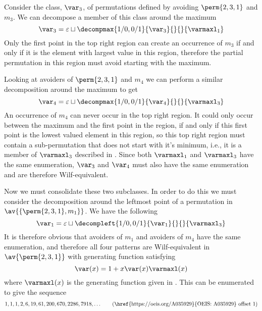 Consider the class, \(\scriptvar_3\), of permutations defined by avoiding \(\perm{2,3,1}\) and \(m_3\). We can decompose a member of this class around the maximum
\begin{equation*}
    \scriptvar_3 = \varepsilon \sqcup
    \decompmax{1/0,0/1}{\scriptvar_3}{}{}{\mathcal{\varmaxl}_1}
\end{equation*}
Only the first point in the top right region can
create an occurrence of \(m_3\) if and only if it is the
element with largest value in this region, therefore the partial permutation
in this region must avoid starting with the maximum.

Looking at avoiders of \(\perm{2,3,1}\) and \(m_4\) we
can perform a similar decomposition around the maximum to get
\begin{equation*}
    \scriptvar_4 = \varepsilon \sqcup
    \decompmax{1/0,0/1}{\scriptvar_4}{}{}{\mathcal{\varmaxl}_3}
\end{equation*}
An occurrence of \(m_4\) can never occur in the
top right region. It could only occur between the maximum and the first point
in the region, if and only if this first point is the lowest valued element in
this region, so this top right region must contain a sub-permutation that does not
start with it's minimum, i.e., it is a member of \(\mathcal{\varmaxl}_3\) described
in .
Since both \(\mathcal{\varmaxl}_1\) and \(\mathcal{\varmaxl}_3\) have the same
enumeration, \(\scriptvar_3\) and \(\scriptvar_4\) must also have
the same enumeration and are therefore Wilf-equivalent.

Now we must consolidate these two subclasses. In order to do this we must
consider the decomposition around the leftmost point of a permutation in
\(\av{\{\perm{2,3,1},m_1\}}\). We have the following
\begin{equation*}
    \scriptvar_1 = \varepsilon \sqcup
    \decompleft{1/0,0/1}{\scriptvar_1}{}{}{\mathcal{\varmaxl}_3}
\end{equation*}
It is therefore obvious that avoiders of \(m_1\) and avoiders of \(m_4\)
have the same enumeration, and therefore all four patterns are Wilf-equivalent
in \(\av{\perm{2,3,1}}\) with generating function satisfying
\begin{equation*}
    \var(x) = 1 + x\var(x)\varmaxl(x)
\end{equation*}
where \(\varmaxl(x)\) is the generating function given in .
This can be enumerated to give the sequence
\begin{equation*}
    1, 1, 1, 2, 6, 19, 61, 200, 670, 2286, 7918,\dotsc \tag{\href{https://oeis.org/A035929}{OEIS: A035929} offset 1}
\end{equation*}

